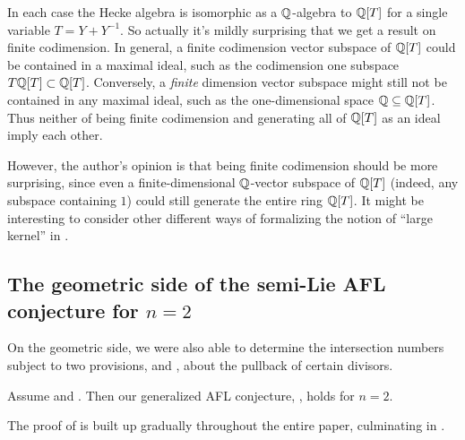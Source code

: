\begin{remark}
  In each case the Hecke algebra is isomorphic as a $\mathbb Q$-algebra to $\mathbb Q[T]$
  for a single variable $T = Y+Y^{-1}$.
  So actually it's mildly surprising that we get a result on finite codimension.
  In general, a finite codimension vector subspace of $\mathbb Q[T]$ could
  be contained in a maximal ideal,
  such as the codimension one subspace $T \mathbb Q[T] \subset \mathbb Q[T]$.
  Conversely, a \emph{finite} dimension vector subspace might still
  not be contained in any maximal ideal,
  such as the one-dimensional space $\mathbb Q \subseteq \mathbb Q[T]$.
  Thus neither of being finite codimension and generating all of $\mathbb Q[T]$ as an ideal
  imply each other.

  However, the author's opinion is that being finite codimension should be more surprising,
  since even a finite-dimensional $\mathbb Q$-vector subspace of $\mathbb Q[T]$
  (indeed, any subspace containing $1$) could still generate the entire ring $\mathbb Q[T]$.
  It might be interesting to consider other different ways
  of formalizing the notion of ``large kernel'' in .
\end{remark}

\subsection{The geometric side of the semi-Lie AFL conjecture for $n=2$}
On the geometric side, we were also able to determine the intersection numbers
subject to two provisions,
 and ,
about the pullback of certain divisors.
\begin{theorem}
  \label{thm:semi_lie_n_equals_2}
  Assume  and .
  Then our generalized AFL conjecture, , holds for $n = 2$.
\end{theorem}
The proof of  is built up gradually
throughout the entire paper, culminating in .

